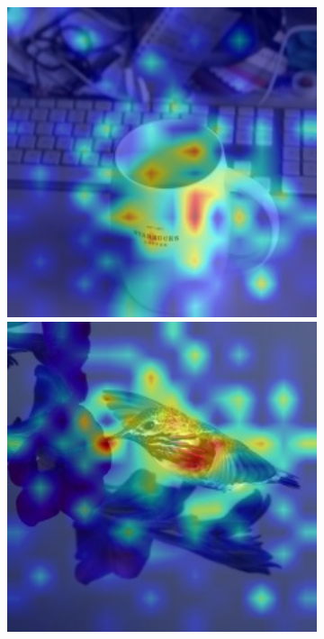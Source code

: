 \begin{figure}[t]
\begin{subfigure}[b]{0.19\textwidth}
        \includegraphics[width=1\textwidth]{figures/qualitative_results/ILSVRC2012_val_00016576_resmlp_24_224.JPEG}
        \includegraphics[width=1\textwidth]{figures/qualitative_results/ILSVRC2012_val_00005779_resmlp_24_224.JPEG}

\end{subfigure}
\end{figure}
